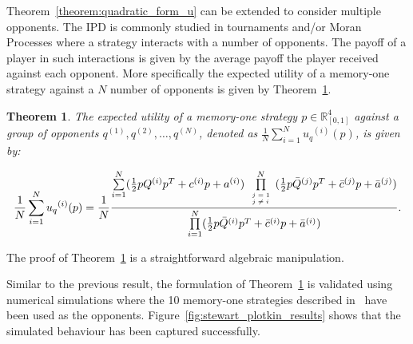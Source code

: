 \documentclass[10pt]{article}
\newtheorem{theorem}{Theorem}
\begin{document}
Theorem~\ref{theorem:quadratic_form_u} can be extended to consider multiple
opponents. The IPD is commonly studied in tournaments and/or Moran Processes
where a strategy interacts with a number of opponents. The payoff of a player in
such interactions is given by the average payoff the player received against
each opponent. More specifically the expected utility of a memory-one strategy
against a \(N\) number of opponents is given by
Theorem~\ref{theorem:tournament_utility}.

\begin{theorem}\label{theorem:tournament_utility}
    The expected utility of a memory-one strategy \(p\in\mathbb{R}_{[0,1]}^4\)
    against a group of opponents \(q^{(1)}, q^{(2)}, \dots, q^{(N)}\), denoted
    as \(\frac{1}{N} \sum\limits_{i=1} ^ {N} {u_q}^{(i)} (p)\), is given by:

    \begin{equation}\label{eq:tournament_utility}
        \frac{1}{N} \sum\limits_{i=1} ^ {N} {u_q}^{(i)} (p) = \frac{1}{N}
        \frac{\sum\limits_{i=1} ^ {N} (\frac{1}{2} pQ^{(i)} p^T + c^{(i)} p + a^ {(i)})
        \prod\limits_{\tiny\begin{array}{l} j=1 \\ j \neq i \end{array}} ^
        N (\frac{1}{2} p\bar{Q}^{(j)} p^T + \bar{c}^{(j)} p + \bar{a}^ {(j)})}
        {\prod\limits_{i=1} ^ N (\frac{1}{2} p\bar{Q}^{(i)} p^T + \bar{c}^{(i)} p + \bar{a}^ {(i)})}.
    \end{equation}
\end{theorem}

The proof of Theorem~\ref{theorem:tournament_utility} is a straightforward algebraic
manipulation.

Similar to the previous result, the formulation of
Theorem~\ref{theorem:tournament_utility} is validated using numerical
simulations where the 10 memory-one strategies described in~\cite{Stewart2012}
have been used as the opponents. Figure~\ref{fig:stewart_plotkin_results} shows
that the simulated behaviour has been captured successfully.
\end{document}

